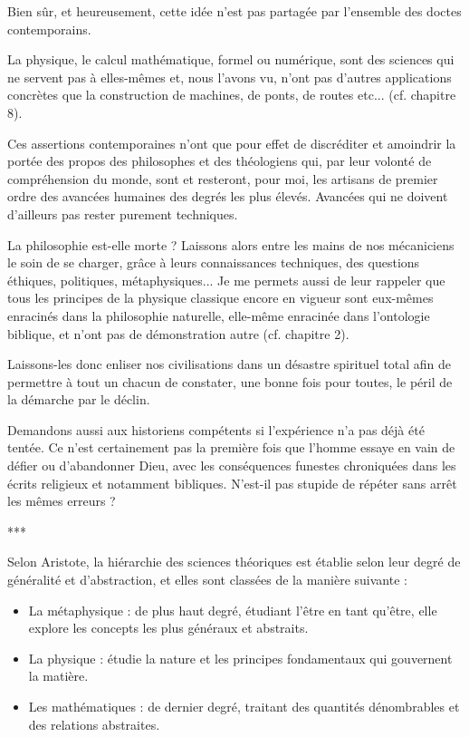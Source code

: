 Bien sûr, et heureusement, cette idée n'est pas partagée par l'ensemble des doctes contemporains.

La physique, le calcul mathématique, formel ou numérique, sont des sciences qui ne servent pas à elles-mêmes et, nous l'avons vu, n'ont pas d'autres applications concrètes que la construction de machines, de ponts, de routes etc... (cf. chapitre 8).

Ces assertions contemporaines n'ont que pour effet de discréditer et amoindrir la portée des propos des philosophes et des théologiens qui, par leur volonté de compréhension du monde, sont et resteront, pour moi, les artisans de premier ordre des avancées humaines des degrés les plus élevés. Avancées qui ne doivent d'ailleurs pas rester purement techniques.

La philosophie est-elle morte ? Laissons alors entre les mains de nos mécaniciens le soin de se charger, grâce à leurs connaissances techniques, des questions éthiques, politiques, métaphysiques... Je me permets aussi de leur rappeler que tous les principes de la physique classique encore en vigueur sont eux-mêmes enracinés dans la philosophie naturelle, elle-même enracinée dans l'ontologie biblique, et n'ont pas de démonstration autre (cf. chapitre 2).

Laissons-les donc enliser nos civilisations dans un désastre spirituel total afin de permettre à tout un chacun de constater, une bonne fois pour toutes, le péril de la démarche par le déclin.

Demandons aussi aux historiens compétents si l'expérience n'a pas déjà été tentée. Ce n'est certainement pas la première fois que l'homme essaye en vain de défier ou d'abandonner Dieu, avec les conséquences funestes chroniquées dans les écrits religieux et notamment bibliques. N'est-il pas stupide de répéter sans arrêt les mêmes erreurs ?


\begin{center}
***
\end{center}

Selon Aristote, la hiérarchie des sciences théoriques est établie selon leur degré de généralité et d'abstraction, et elles sont classées de la manière suivante :

\begin{itemize}
\item La métaphysique : de plus haut degré, étudiant l'être en tant qu'être, elle explore les concepts les plus généraux et abstraits.
\item La physique : étudie la nature et les principes fondamentaux qui gouvernent la matière.
\item Les mathématiques : de dernier degré, traitant des quantités dénombrables et des relations abstraites.
\end{itemize}

